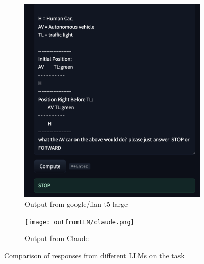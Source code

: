 \documentclass[conference]{IEEEtran}
\begin{document}
\begin{figure}[h]
\begin{subfigure}[b]{0.3\textwidth}
        \includegraphics[width=\linewidth]{outfromLLM/google:flan-t5-large.png}
        \caption{Output from google/flan-t5-large}
    \end{subfigure}

    \vspace{1em}

    \begin{subfigure}[b]{0.3\textwidth}
        \texttt{[image: outfromLLM/claude.png]}
        \caption{Output from Claude}
    \end{subfigure}

    \caption{Comparison of responses from different LLMs on the task}
    \label{fig:llm_outputs}
\end{figure}







\end{document}
